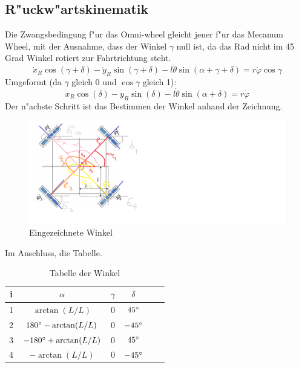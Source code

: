\documentclass[11pt]{article}
\begin{document}
    \subsection{R"uckw"artskinematik}\label{subsubsec:ruck}
    Die Zwangsbedingung f"ur das Omni-wheel gleicht jener f"ur das Mecanum Wheel, mit der Ausnahme, dass der Winkel $\gamma$ null ist, da das Rad nicht im 45 Grad Winkel rotiert zur Fahrtrichtung steht.
    \begin{equation}
        \dot{x}_{R}\cos\left(  \gamma + \delta \right) - \dot{y}_{R}\sin\left( \gamma + \delta \right) - l \dot{\theta}\sin\left( \alpha + \gamma + \delta \right) = r\dot{\varphi}\cos\gamma\label{eq:zwang}
    \end{equation}
    Umgeformt (da $ \gamma $ gleich 0 und $ \cos\gamma $ gleich 1):
    \begin{equation}
        \dot{x}_{R}\cos\left(\delta \right) - \dot{y}_{R}\sin\left(\delta \right) - l \dot{\theta}\sin\left( \alpha + \delta \right) = r\dot{\varphi}\label{eq:zwangumgf}
    \end{equation}
    Der n"achste Schritt ist das Bestimmen der Winkel anhand der Zeichnung.
    \begin{figure}[H]
        \includegraphics{../images/aufgabeDOriginalWinkelV2.png}
        \caption{Eingezeichnete Winkel}
        \label{fig:winkel}
    \end{figure}
    Im Anschluss, die Tabelle.
    \begin{table}[H]
        \begin{tabular}{|c|c|c|c|c|c}
            \hline
            i & $\alpha$                     & $\gamma$ & $\delta$     \\ \hline
            1 & $\arctan(L/L)$               & 0        & $45\degree$  \\ \hline
            2 & $180\degree - \arctan(L/L)$  & 0        & $-45\degree$ \\ \hline
            3 & $-180\degree + \arctan(L/L)$ & 0        & $45\degree$  \\ \hline
            4 & $- \arctan(L/L)$             & 0        & $-45\degree$ \\ \hline
        \end{tabular}\caption{Tabelle der Winkel}\label{tab:winkeltab}
        \label{tab:winkeltabelle}
    \end{table}
\end{document}

